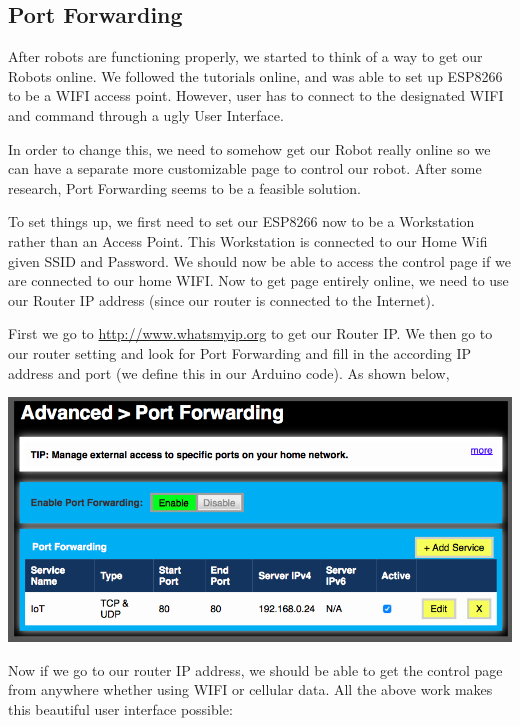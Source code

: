 \documentclass[a0,landscape]{a0poster}
\begin{document}
\begin{multicols}{4}
\section*{Port Forwarding}
After robots are functioning properly, we started to think of a way to get our Robots online. We followed the tutorials online, and was able to set up ESP8266 to be a WIFI access point. However, user has to connect to the designated WIFI and command through a ugly User Interface. \par
In order to change this, we need to somehow get our Robot really online so we can have a separate more customizable page to control our robot. After some research, Port Forwarding seems to be a feasible solution. \par
To set things up, we first need to set our ESP8266 now to be a Workstation rather than an Access Point. This Workstation is connected to our Home Wifi given SSID and Password. We should now be able to access the control page if we are connected to our home WIFI. Now to get page entirely online, we need to use our Router IP address (since our router is connected to the Internet). \par
First we go to \url{http://www.whatsmyip.org} to get our Router IP. We then go to our router setting and look for Port Forwarding and fill in the according IP address and port (we define this in our Arduino code). As shown below,
\begin{center}\vspace{1cm}
\includegraphics[width=0.8\linewidth]{pf}
\end{center}\vspace{1cm}
Now if we go to our router IP address, we should be able to get the control page from anywhere whether using WIFI or cellular data. All the above work makes this beautiful user interface possible:
\begin{center}\vspace{1cm}

\end{center}
\end{multicols}
\end{document}
